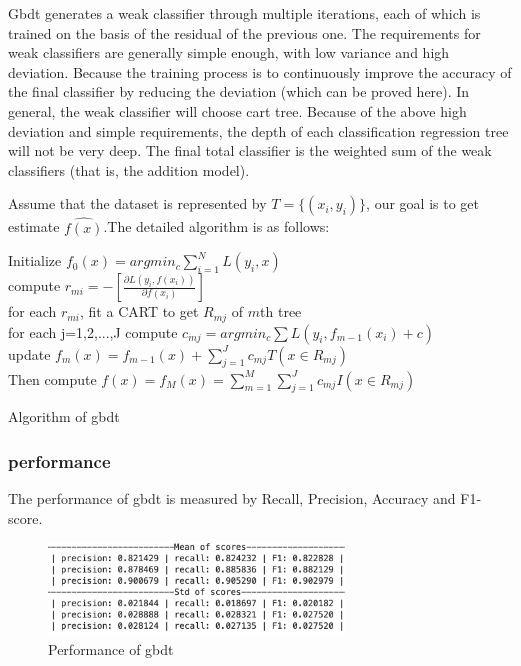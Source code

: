 \documentclass[11pt,en,cite=authoryear]{elegantpaper}
\begin{document}
Gbdt generates a weak classifier through multiple iterations, each of which is trained on the basis of the residual of the previous one. The requirements for weak classifiers are generally simple enough, with low variance and high deviation. Because the training process is to continuously improve the accuracy of the final classifier by reducing the deviation (which can be proved here).
In general, the weak classifier will choose cart tree. Because of the above high deviation and simple requirements, the depth of each classification regression tree will not be very deep. The final total classifier is the weighted sum of the weak classifiers (that is, the addition model).


Assume that the dataset is represented by $T=\{(x_i, y_i)\}$, our goal is to get estimate $\hat{f(x)}$.The detailed algorithm is as follows:

\begin{algorithm}[H]
\SetAlgoLined
{}
Initialize $f_0(x) = argmin_c \sum_{i=1}^N L(y_i, x)$\\
{
  	{
	compute $r_{mi} = -[\frac{\partial L(y_i, f(x_i))}{\partial f(x_i)}]$\\
	for each $r_{mi}$, fit a CART to get $R_{mj}$ of $m$th tree\\
	for each j=1,2,...,J compute $c_{mj} = argmin_c \sum L(y_i, f_{m-1}(x_i)+c)$\\
	update $f_m(x) = f_{m-1}(x) + \sum_{j=1}^J c_{mj}T(x \in R_{mj})$\\
	}
  Then compute $\hat{f(x)} = f_M(x) = \sum_{m=1}^M \sum_{j=1}^J c_{mj}I (x \in R_{mj})$
}
\caption{Algorithm of gbdt}
\end{algorithm}

\subsubsection{performance}
The performance of gbdt is measured by Recall, Precision, Accuracy and F1-score.

\begin{figure}[H]
	\centering
	\includegraphics[width=0.7\textwidth]{image/gbdt_perf.png}
	\caption{Performance of gbdt}
	\label{gbdt1_performance}
\end{figure}


\end{document}
